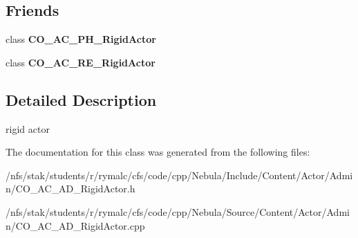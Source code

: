 \subsection*{Friends}
\begin{DoxyCompactItemize}
\item 
\hypertarget{classContent_1_1Actor_1_1Admin_1_1RigidActor_a66a17f54ce341ccc6c9b133f1efef5af}{
class {\bfseries CO\_\-AC\_\-PH\_\-RigidActor}}
\label{classContent_1_1Actor_1_1Admin_1_1RigidActor_a66a17f54ce341ccc6c9b133f1efef5af}

\item 
\hypertarget{classContent_1_1Actor_1_1Admin_1_1RigidActor_a4c1c3999e996a1d2780c234f5c31e6b5}{
class {\bfseries CO\_\-AC\_\-RE\_\-RigidActor}}
\label{classContent_1_1Actor_1_1Admin_1_1RigidActor_a4c1c3999e996a1d2780c234f5c31e6b5}

\end{DoxyCompactItemize}


\subsection{Detailed Description}
rigid actor 

The documentation for this class was generated from the following files:\begin{DoxyCompactItemize}
\item 
/nfs/stak/students/r/rymalc/cfs/code/cpp/Nebula/Include/Content/Actor/Admin/CO\_\-AC\_\-AD\_\-RigidActor.h\item 
/nfs/stak/students/r/rymalc/cfs/code/cpp/Nebula/Source/Content/Actor/Admin/CO\_\-AC\_\-AD\_\-RigidActor.cpp\end{DoxyCompactItemize}
